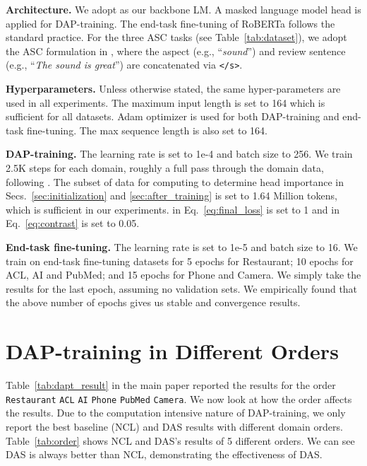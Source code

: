 \documentclass{article} \usepackage{iclr2023_conference,times}
\begin{document}
\textbf{Architecture.} We adopt  as our backbone LM. A masked language model head is applied for DAP-training. The end-task fine-tuning of RoBERTa follows the standard practice. 
For the three ASC tasks (see Table~\ref{tab:dataset}), we adopt the ASC formulation in \cite{DBLP:conf/naacl/XuLSY19}, where the aspect (e.g., ``\textit{sound}'') and review sentence (e.g., ``\textit{The sound is great}'') are concatenated via \texttt{</s>}. 

\textbf{Hyperparameters.} Unless otherwise stated, the same hyper-parameters are used in all experiments. The maximum input length is set to 164 which is sufficient for all datasets. Adam optimizer is used for both DAP-training and end-task fine-tuning. The max sequence length is also set to 164. 

\textbf{DAP-training.} The learning rate is set to 1e-4 and batch size to 256. We train 2.5K steps for each domain, roughly a full pass through the domain data, following \cite{DBLP:conf/acl/GururanganMSLBD20,DBLP:conf/naacl/XuLSY19}. The subset of data  for computing  to determine head importance in Secs.~\ref{sec:initialization} and \ref{sec:after_training} is set to 1.64 Million tokens, which is sufficient in our experiments.  in Eq.~\ref{eq:final_loss} is set to 1 and  in Eq.~\ref{eq:contrast} is set to 0.05. 

\textbf{End-task fine-tuning.} The learning rate is set to 1e-5 and batch size to 16. We train on end-task fine-tuning datasets for 5 epochs for Restaurant; 10 epochs for ACL, AI and PubMed; and 15 epochs for Phone and Camera. We simply take the results for the last epoch, assuming no validation sets. We empirically found that the above number of epochs gives us stable and convergence results. 



\section{DAP-training in Different Orders}
\label{ap:order}

Table~\ref{tab:dapt_result} in the main paper reported the results for the order \texttt{Restaurant}  \texttt{ACL}  \texttt{AI}  \texttt{Phone}  \texttt{PubMed}  \texttt{Camera}. We now look at how the order affects the results. Due to the computation intensive nature of DAP-training, we only report the best baseline (NCL) and DAS results with different domain orders. Table~\ref{tab:order} shows NCL and DAS's results of 5 different orders. We can see DAS is always better than NCL, demonstrating the effectiveness of DAS.
\end{document}
